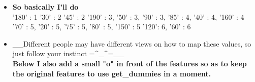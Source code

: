 \documentclass[11pt]{article}
\providecommand{\tightlist}{%
      \setlength{\itemsep}{0pt}\setlength{\parskip}{0pt}}
\begin{document}
    \begin{itemize}
\tightlist
\item
  \textbf{So basically I'll do}\\
  '180' : 1 '30' : 2 '45' : 2 '190' : 3, '50' : 3, '90' : 3, '85' : 4,
  '40' : 4, '160' : 4 '70' : 5, '20' : 5, '75' : 5, '80' : 5, '150' : 5
  '120': 6, '60' : 6
\end{itemize}

    \begin{itemize}
\tightlist
\item
  \_\_Different people may have different views on how to map these
  values, so just follow your instinct =\^{}\_\^{}=\_\_\\
  \textbf{Below I also add a small "o" in front of the features so as to
  keep the original features to use get\_dummies in a moment.}
\end{itemize}
\end{document}
